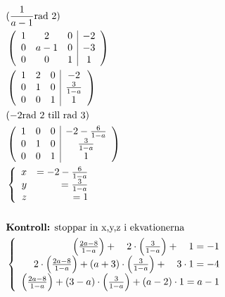 \begin{multicols}{2}
\begin{align*}
  &\quad (\frac{1}{a-1} \text{rad 2}) \\
  &\quad \left(\begin{array}{ccc|c}
    1 & 2 & 0 & -2 \\
    0 & a-1 & 0 & -3 \\
    0 & 0 & 1 & 1
  \end{array}\right) \\
  &\quad \left(\begin{array}{ccc|c}
    1 & 2 & 0 & -2 \\
    0 & 1 & 0 & \frac{3}{1-a} \\
    0 & 0 & 1 & 1
  \end{array}\right) \\  
  &\quad (-2 \text{rad 2 till rad 3}) \\
  &\quad \left(\begin{array}{ccc|c}
    1 & 0 & 0 & -2 - \frac{6}{1-a} \\
    0 & 1 & 0 & \frac{3}{1-a} \\
    0 & 0 & 1 & 1
  \end{array}\right) \\  
  &\quad \left\{\begin{array}{rr}
  x & = -2 - \frac{6}{1-a} \\
  y & = \frac{3}{1-a} \\
  z & = 1
  \end{array}\right. \\
  &\quad \\
  &\quad \text{\textbf{Kontroll:} stoppar in x,y,z i ekvationerna} \\
  &\quad \left\{\begin{array}{r}
  \left(\frac{2 a-8}{1-a}\right)+\quad 2 \cdot\left(\frac{3}{1-a}\right)+\quad 1=-1 \\
  2 \cdot\left(\frac{2 a-8}{1-a}\right)+(a+3) \cdot\left(\frac{3}{1-a}\right)+\quad 3 \cdot 1=-4 \\
  \left(\frac{2 a-8}{1-a}\right)+(3-a) \cdot\left(\frac{3}{1-a}\right)+(a-2) \cdot 1=a-1
  \end{array}\right.
\end{align*}



\end{multicols}
